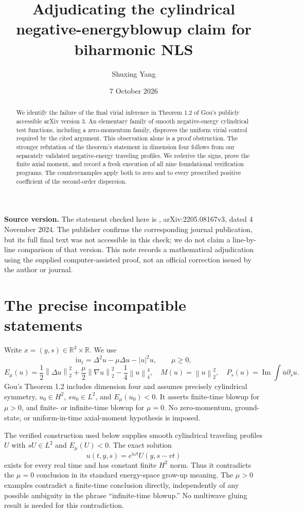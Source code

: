 \documentclass[11pt,a4paper]{article}
\title{Adjudicating the cylindrical negative-energy\newline blowup claim for biharmonic NLS}
\author{Shuxing Yang}
\date{7 October 2026}
\newcommand{\R}{\mathbb R}
\newcommand{\ii}{\mathrm i}
\newcommand{\norm}[1]{\left\|#1\right\|}
\begin{document}
\maketitle
\begin{abstract}
We identify the failure of the final virial inference in Theorem 1.2 of Gou's publicly accessible arXiv version 3. An elementary family of smooth negative-energy cylindrical test functions, including a zero-momentum family, disproves the uniform virial control required by the cited argument. This observation alone is a proof obstruction. The stronger refutation of the theorem's statement in dimension four follows from our separately validated negative-energy traveling profiles. We rederive the signs, prove the finite axial moment, and record a fresh execution of all nine foundational verification programs. The counterexamples apply both to zero and to every prescribed positive coefficient of the second-order dispersion.
\end{abstract}

\noindent\textbf{Source version.} The statement checked here is \cite[Theorem 1.2]{Gou}, arXiv:2205.08167v3, dated 4 November 2024. The publisher confirms the corresponding journal publication, but its full final text was not accessible in this check; we do not claim a line-by-line comparison of that version. This note records a mathematical adjudication using the supplied computer-assisted proof, not an official correction issued by the author or journal. 

\section{The precise incompatible statements}
Write $x=(y,s)\in\R^3\times\R$. We use
\begin{equation}\label{pde}
 \ii u_t=\Delta^2u-\mu\Delta u-|u|^2u,\qquad \mu\ge0,
\end{equation}
\[
 E_\mu(u)=\frac12\norm{\Delta u}_2^2+\frac\mu2\norm{\nabla u}_2^2-\frac14\norm u_4^4,
 \quad M(u)=\norm u_2^2,\quad P_s(u)=\operatorname{Im}\int\bar u\partial_su.
\]
Gou's Theorem 1.2 includes dimension four and assumes precisely cylindrical symmetry, $u_0\in H^2$, $su_0\in L^2$, and $E_\mu(u_0)<0$. It asserts finite-time blowup for $\mu>0$, and finite- or infinite-time blowup for $\mu=0$. No zero-momentum, ground-state, or uniform-in-time axial-moment hypothesis is imposed.

The verified construction used below supplies smooth cylindrical traveling profiles $U$ with $sU\in L^2$ and $E_\mu(U)<0$. The exact solution
\begin{equation}\label{traveler}
 u(t,y,s)=e^{\ii\omega t}U(y,s-vt)
\end{equation}
exists for every real time and has constant finite $H^2$ norm. Thus it contradicts the $\mu=0$ conclusion in its standard energy-space grow-up meaning. The $\mu>0$ examples contradict a finite-time conclusion directly, independently of any possible ambiguity in the phrase ``infinite-time blowup.'' No multiwave gluing result is needed for this contradiction.
\end{document}
